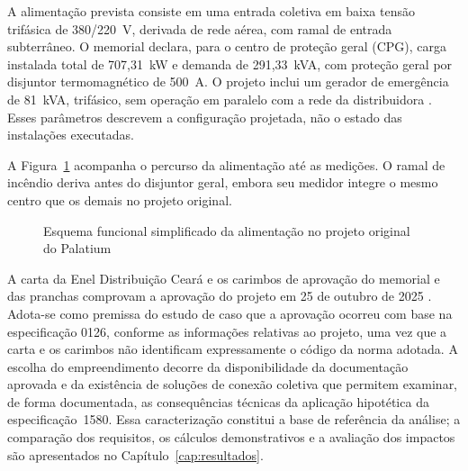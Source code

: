 A alimentação prevista consiste em uma entrada coletiva em baixa tensão trifásica de 380/220~V, derivada de rede aérea, com ramal de entrada subterrâneo. O memorial declara, para o centro de proteção geral (CPG), carga instalada total de 707,31~kW e demanda de 291,33~kVA, com proteção geral por disjuntor termomagnético de 500~A. O projeto inclui um gerador de emergência de 81~kVA, trifásico, sem operação em paralelo com a rede da distribuidora \cite[p.~1 e~7]{palatiummemorial2025}\cite[pranchas~003 e~004]{palatiumpranchas2025}. Esses parâmetros descrevem a configuração projetada, não o estado das instalações executadas.

A Figura~\ref{fig:entrada-original} acompanha o percurso da alimentação até as medições. O ramal de incêndio deriva antes do disjuntor geral, embora seu medidor integre o mesmo centro que os demais no projeto original.

\begin{figure}[!htbp]
\centering
\caption{Esquema funcional simplificado da alimentação no projeto original do Palatium}\label{fig:entrada-original}
\end{figure}

A carta da Enel Distribuição Ceará e os carimbos de aprovação do memorial e das pranchas comprovam a aprovação do projeto em 25 de outubro de 2025 \cite{enelaprovacao2025}\cite[p.~1]{palatiummemorial2025}\cite[pranchas~001--005]{palatiumpranchas2025}. Adota-se como premissa do estudo de caso que a aprovação ocorreu com base na especificação 0126, conforme as informações relativas ao projeto, uma vez que a carta e os carimbos não identificam expressamente o código da norma adotada. A escolha do empreendimento decorre da disponibilidade da documentação aprovada e da existência de soluções de conexão coletiva que permitem examinar, de forma documentada, as consequências técnicas da aplicação hipotética da especificação~1580. Essa caracterização constitui a base de referência da análise; a comparação dos requisitos, os cálculos demonstrativos e a avaliação dos impactos são apresentados no Capítulo~\ref{cap:resultados}.

